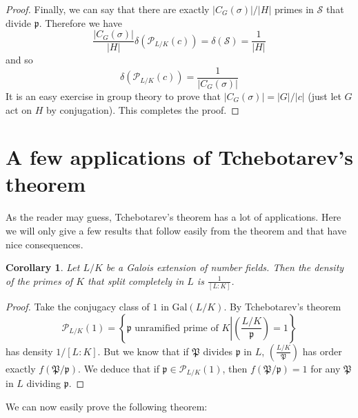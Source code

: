 \documentclass[]{amsart}
\newtheorem{coro}{Corollary}
\renewcommand{\S}{\mathcal{S}}
\newcommand{\p}{\mathfrak{p}}
\renewcommand{\P}{\mathfrak{P}}
\newcommand{\PP}{\mathcal{P}}
\newcommand{\Frob}[2]{\left(\frac{#1}{#2}\right )}
\newcommand{\Gal}{\text{Gal}}
\begin{document}
\begin{proof}
			Finally, we can say that there are exactly $|C_G(\sigma)|/|H|$ primes in $\S$ that divide $\p$. Therefore we have
			\[\frac{|C_G(\sigma)|}{|H|}\delta(\PP_{L/K}(c))=\delta(\S)=\frac{1}{|H|}\]
			and so 
			\[\delta(\PP_{L/K}(c))=\frac{1}{|C_G(\sigma)|}\]
			It is an easy exercise in group theory to prove that $|C_G(\sigma)|=|G|/|c|$ (just let $G$ act on $H$ by conjugation). This completes the proof. 
		\end{proof}
		
		\section{A few applications of Tchebotarev's theorem}
			As the reader may guess, Tchebotarev's theorem has a lot of applications. Here we will only give a few results that follow easily from the theorem and that have nice consequences.
			
			\begin{coro}
				Let $L/K$ be a Galois extension of number fields. Then the density of the primes of $K$ that split completely in $L$ is $\frac{1}{[L:K]}$.
			\end{coro}
			\begin{proof}
				Take the conjugacy class of $1$ in $\Gal(L/K)$. By Tchebotarev's theorem
				\[\PP_{L/K}(1)=\left \{\p\text{ unramified prime of }K\left |\Frob{L/K}{\p}=1\right .\right \}\]
				has density $1/[L:K]$. But we know that if $\P$ divides $\p$ in $L$, $\Frob{L/K}{\P}$ has order exactly $f(\P/\p)$. We deduce that if $\p\in\PP_{L/K}(1)$, then $f(\P/\p)=1$ for any $\P$ in $L$ dividing $\p$.
			\end{proof}
			
			We can now easily prove the following theorem:
			
\end{document}
